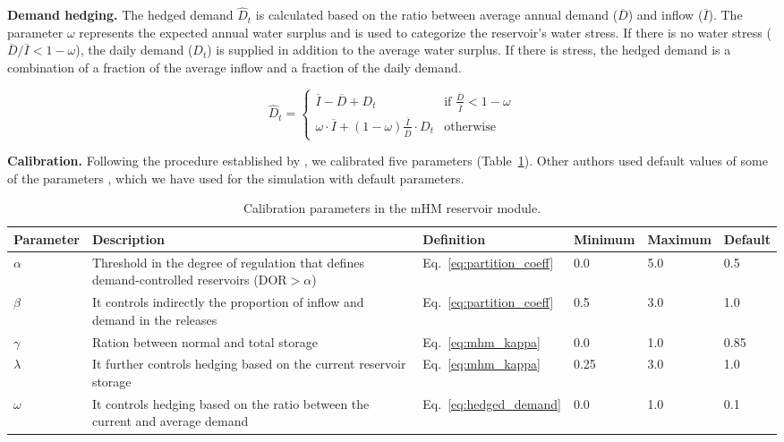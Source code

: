 \documentclass[hess, manuscript]{copernicus}
\begin{document}
\medskip
\textbf{Demand hedging.} The hedged demand $\hat{D}_t$ is calculated based on the ratio between average annual demand ($\overline{D}$) and inflow ($\overline{I}$). The parameter $\omega$ represents the expected annual water surplus and is used to categorize the reservoir's water stress. If there is no water stress ($\overline{D}/\overline{I} < 1 - \omega$), the daily demand ($D_t$) is supplied in addition to the average water surplus. If there is stress, the hedged demand is a combination of a fraction of the average inflow and a fraction of the daily demand.

\begin{equation}
\label{eq:hedged_demand}
    \hat{D}_t =
    \begin{cases}
        \overline{I} - \overline{D} + D_t  & \text{if } \frac{\overline{D}}{\overline{I}} < 1 - \omega \\
        \omega \cdot \overline{I} + (1 - \omega) \frac{\overline{I}}{\overline{D}} \cdot D_t & \text{otherwise}        
    \end{cases}
\end{equation}

\medskip
\textbf{Calibration.} Following the procedure established by \citet{Shrestha2024}, we calibrated five parameters (Table~\ref{tab:parameters_mhm}). Other authors used default values of some of the parameters \citep{Hanasaki2006, Shin2019, Sadki2023}, which we have used for the simulation with default parameters.

\begin{table}[t]
    \centering
    \caption{Calibration parameters in the mHM reservoir module.}
    \begin{tabularx}{\textwidth}{lXllll}
        \toprule
       \textbf{Parameter} & \textbf{Description} & \textbf{Definition} & \textbf{Minimum} & \textbf{Maximum} & \textbf{Default} \\
        \midrule
        $\alpha$ & Threshold in the degree of regulation that defines demand-controlled reservoirs ($\text{DOR} > \alpha$) & Eq.~\ref{eq:partition_coeff} & 0.0 & 5.0 & 0.5 \\
        $\beta$ & It controls indirectly the proportion of inflow and demand in the releases & Eq.~\ref{eq:partition_coeff} & 0.5 & 3.0 & 1.0 \\
        $\gamma$ & Ration between normal and total storage & Eq.~\ref{eq:mhm_kappa} & 0.0 & 1.0 & 0.85 \\
        $\lambda$ & It further controls hedging based on the current reservoir storage & Eq.~\ref{eq:mhm_kappa} & 0.25 & 3.0 & 1.0 \\
        $\omega$ & It controls hedging based on the ratio between the current and average demand & Eq.~\ref{eq:hedged_demand} & 0.0 & 1.0 & 0.1 \\
         \bottomrule
    \end{tabularx}
    \label{tab:parameters_mhm}
\end{table}
\end{document}
